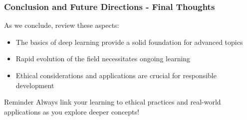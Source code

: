 \documentclass[aspectratio=169]{beamer}
\begin{document}
\begin{frame}[fragile]
    \frametitle{Conclusion and Future Directions - Final Thoughts}
    As we conclude, review these aspects:
    \begin{itemize}
        \item The basics of deep learning provide a solid foundation for advanced topics
        \item Rapid evolution of the field necessitates ongoing learning
        \item Ethical considerations and applications are crucial for responsible development
    \end{itemize}
    \begin{block}{Reminder}
        Always link your learning to ethical practices and real-world applications as you explore deeper concepts!
    \end{block}
\end{frame}
\end{document}
